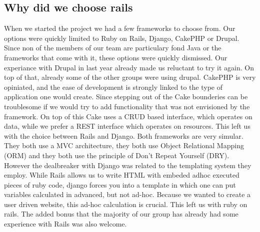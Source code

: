 \subsection{Why did we choose rails} %
\label{sub:Why did we choose rails}
When we started the project we had a few frameworks to choose from. Our options were quickly limited to Ruby on Rails, Django, CakePHP or Drupal. Since non of the members of our team are particulary fond Java or the frameworks that come with it, these options were quickly dismissed. 
Our experiance with Drupal in last year already made us reluctant to try it again. On top of that, already some of the other groups were using drupal.
CakePHP is very opiniated, and the ease of development is strongly linked to the type of application one would create. Since stepping out of the Cake bounderies can be troublesome if we would try to add functionality that was not envisioned by the framework. On top of this Cake uses a CRUD based interface, which operates on data, while we prefer a REST interface which operates on resources.
This left us with the choice between Rails and Django. Both frameworks are very simular. They both use a MVC architecture, they both use Object Relational Mapping (ORM) and they both use the principle of Don't Repeat Yourself (DRY). However the dealbreaker with Django was related to the templating system they employ. While Rails allows us to write HTML with embeded adhoc executed pieces of ruby code, django forces you into a template in which one can put variables calculated in advanced, but not ad-hoc. Because we wanted to create a user driven website, this ad-hoc calculation is crucial.
This left us with ruby on rails. The added bonus that the majority of our group has already had some experience with Rails was also welcome.

